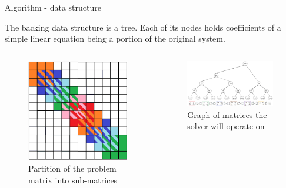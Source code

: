 \documentclass[c]{beamer}
\begin{document}
\begin{frame}{Algorithm - data structure}

The backing data structure is a tree. Each of its nodes holds coefficients of a simple linear equation being a portion of the original system.

\begin{columns}
  \begin{column}{0.2\textwidth}
  \begin{figure}
      \centering
      \includegraphics[width=1.1\textwidth]{img/partition}
      \caption{Partition of the problem matrix into sub-matrices}
    \end{figure}
  \end{column}

  \begin{column}{0.8\textwidth}
    \begin{figure}
      \centering
      \includegraphics[width=0.95\textwidth]{img/tree_mat}
      \caption{Graph of matrices the solver will operate on}
    \end{figure}
  \end{column}
\end{columns}

\end{frame}
\end{document}
